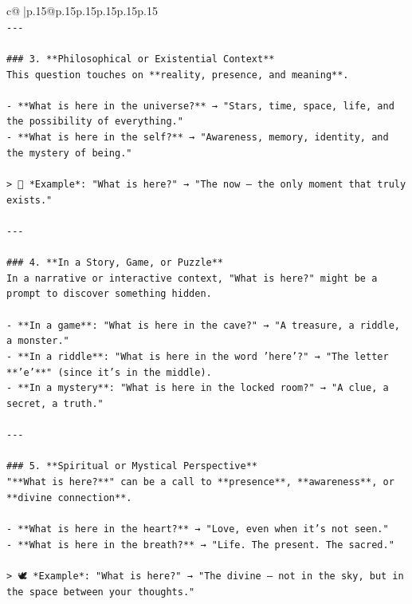 \documentclass{article}
\begin{document}
{\begin{supertabular}{c@{$\;$}|p{.15\linewidth}@{}p{.15\linewidth}p{.15\linewidth}p{.15\linewidth}p{.15\linewidth}p{.15\linewidth}}
{{{\\ 
\texttt{{-}{-}{-}} \\
\\ 
\texttt{\#\#\# 3. **Philosophical or Existential Context**} \\
\texttt{This question touches on **reality, presence, and meaning**.} \\
\\ 
\texttt{{-} **What is here in the universe?** → "Stars, time, space, life, and the possibility of everything."} \\
\texttt{{-} **What is here in the self?** → "Awareness, memory, identity, and the mystery of being."} \\
\\ 
\texttt{> 🌌 *Example*: "What is here?" → "The now — the only moment that truly exists."} \\
\\ 
\texttt{{-}{-}{-}} \\
\\ 
\texttt{\#\#\# 4. **In a Story, Game, or Puzzle**} \\
\texttt{In a narrative or interactive context, "What is here?" might be a prompt to discover something hidden.} \\
\\ 
\texttt{{-} **In a game**: "What is here in the cave?" → "A treasure, a riddle, a monster."} \\
\texttt{{-} **In a riddle**: "What is here in the word 'here'?" → "The letter **'e'**" (since it’s in the middle).} \\
\texttt{{-} **In a mystery**: "What is here in the locked room?" → "A clue, a secret, a truth."} \\
\\ 
\texttt{{-}{-}{-}} \\
\\ 
\texttt{\#\#\# 5. **Spiritual or Mystical Perspective**} \\
\texttt{"**What is here?**" can be a call to **presence**, **awareness**, or **divine connection**.} \\
\\ 
\texttt{{-} **What is here in the heart?** → "Love, even when it’s not seen."} \\
\texttt{{-} **What is here in the breath?** → "Life. The present. The sacred."} \\
\\ 
\texttt{> 🕊️ *Example*: "What is here?" → "The divine — not in the sky, but in the space between your thoughts."} \\
}}}
\end{supertabular}}
\end{document}
